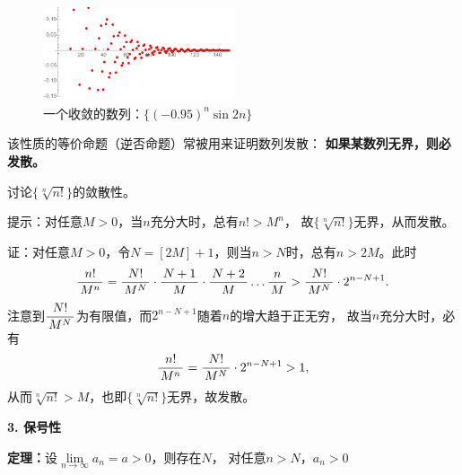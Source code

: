 \begin{figure}[h]
	\centering
	\includegraphics[width=0.5\textwidth]{./Images/Ch01/095nsin2n.pdf}
	\caption{一个收敛的数列：$\{(-0.95)^n\sin2n\}$}
	\label{fig:an-converge}
\end{figure}

该性质的等价命题（逆否命题）常被用来证明数列发散：
{\bf 如果某数列无界，则必发散。}

\begin{shaded}
	\egz 讨论$\{\sqrt[n]{n!}\}$的敛散性。

	提示：对任意$M>0$，当$n$充分大时，总有$n!>M^n$，
	故$\{\sqrt[n]{n!}\}$无界，从而发散。

	证：对任意$M>0$，令$N=[2M]+1$，则当$n>N$时，总有$n>2M$。此时
	$$\displaystyle\frac{\,{n!}\,}{\,{M^n}\,}=\displaystyle\frac{\,{N!}\,}{\,{M^N}\,}\cdot\displaystyle\frac{\,{N+1}\,}{\,{M}\,}
	\cdot\displaystyle\frac{\,{N+2}\,}{\,{M}\,}\ldots\displaystyle\frac{\,{n}\,}{\,{M}\,}>\displaystyle\frac{\,{N!}\,}{\,{M^N}\,}\cdot2^{n-N+1}.$$
	注意到$\displaystyle\frac{\,{N!}\,}{\,{M^N}\,}$为有限值，而$2^{n-N+1}$随着$n$的增大趋于正无穷，
	故当$n$充分大时，必有
	$$\displaystyle\frac{\,{n!}\,}{\,{M^n}\,}=\displaystyle\frac{\,{N!}\,}{\,{M^N}\,}\cdot2^{n-N+1}>1,$$
	从而$\sqrt[n]{n!}>M$，也即$\{\sqrt[n]{n!}\}$无界，故发散。\fin
\end{shaded}

\bs
{\bf 3. 保号性}
\begin{thx}
	{\bf 定理：}设$\lim\limits_{n\to\infty}a_n=a>0$，则存在$N$，
	对任意$n>N$，$a_n>0$	
\end{thx}

